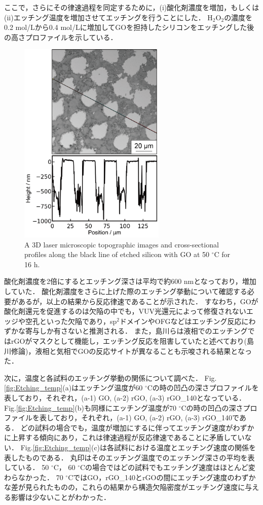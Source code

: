 \documentclass[platex,dvipdfmx]{jlreq}			%
\begin{document}
ここで，さらにその律速過程を同定するために，(i)酸化剤濃度を増加，もしくは(ii)エッチング温度を増加させてエッチングを行うことにした．
H$_2$O$_2$の濃度を0.2 mol/Lから0.4 mol/Lに増加してGOを担持したシリコンをエッチングした後の高さプロファイルを示している．

\begin{figure}[H]
    \centering
    \includegraphics[width=70mm]{figures/figure11.png}
    \caption{A 3D laser microscopic topographic images and cross-sectional profiles along the black line of etched silicon with GO at 50  ${}^\circ$C for 16 h.}
    \label{fig:Laser_h2o2}
\end{figure}

酸化剤濃度を2倍にするとエッチング深さは平均で約600 nmとなっており，増加していた．
酸化剤濃度をさらに上げた際のエッチング挙動について確認する必要があるが，以上の結果から反応律速であることが示された．
すなわち，GOが酸化剤還元を促進するのは欠陥の中でも，VUV光還元によって修復されないエッジや空孔といった欠陥であり，sp$^2$ドメインやOFGなどはエッチング反応にわずかな寄与しか有さないと推測される．
また，島川らは液相でのエッチングではrGOがマスクとして機能し，エッチング反応を阻害していたと述べており(島川修論)，液相と気相でGOの反応サイトが異なることも示唆される結果となった．

次に，温度と各試料のエッチング挙動の関係について調べた．
Fig.\ref{fig:Etching_temp}(a)はエッチング温度が60 ${}^\circ$Cの時の凹凸の深さプロファイルを表しており，それぞれ，(a-1) GO, (a-2) rGO, (a-3) rGO\_140となっている．
Fig.\ref{fig:Etching_temp}(b)も同様にエッチング温度が70 ${}^\circ$Cの時の凹凸の深さプロファイルを表しており，それぞれ，(a-1) GO, (a-2) rGO, (a-3) rGO\_140である．
どの試料の場合でも，温度が増加にするに伴ってエッチング速度がわずかに上昇する傾向にあり，これは律速過程が反応律速であることに矛盾していない．
Fig.\ref{fig:Etching_temp}(c)は各試料における温度とエッチング速度の関係を表したものである．
丸印はそのエッチング温度でのエッチング深さの平均を表している．
50 ${}^\circ$C， 60 ${}^\circ$Cの場合ではどの試料でもエッチング速度はほとんど変わらなかった．
70 ${}^\circ$CではGO，rGO\_140とrGOの間にエッチング速度のわずかな差が見られたものの，これらの結果から構造欠陥密度がエッチング速度に与える影響は少ないことがわかった．
\end{document}
